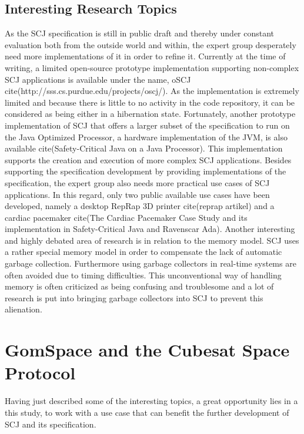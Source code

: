 

\subsection{Interesting Research Topics} %
\label{sub:interestingresearch}
As the SCJ specification is still in public draft and thereby under constant evaluation both from the outside world and within, the expert group desperately need more implementations of it in order to refine it. Currently at the time of writing, a limited open-source prototype implementation supporting non-complex SCJ applications is available under the name, oSCJ cite(http://sss.cs.purdue.edu/projects/oscj/). As the implementation is extremely limited and because there is little to no activity in the code repository, it can be considered as being either in a hibernation state. Fortunately, another prototype implementation of SCJ that offers a larger subset of the specification to run on the Java Optimized Processor, a hardware implementation of the JVM, is also available cite(Safety-Critical Java on a Java Processor). This implementation supports the creation and execution of more complex SCJ applications. Besides supporting the specification development by providing implementations of the specification, the expert group also needs more practical use cases of SCJ applications. In this regard, only two public available use cases have been developed, namely a desktop RepRap 3D printer cite(reprap artikel) and a cardiac pacemaker cite(The Cardiac Pacemaker Case Study and its implementation in Safety-Critical Java and Ravenscar Ada). Another interesting and highly debated area of research is in relation to the memory model. SCJ uses a rather special memory model in order to compensate the lack of automatic garbage collection. Furthermore using garbage collectors in real-time systems are often avoided due to timing difficulties. This unconventional way of handling memory is often criticized as being confusing and troublesome and a lot of research is put into bringing garbage collectors into SCJ to prevent this alienation.

\section{GomSpace and the Cubesat Space Protocol} %
\label{sec:gomspace_and_the_cubesat_space_protocol}
Having just described some of the interesting topics, a great opportunity lies in a this study, to work with a use case that can benefit the further development of SCJ and its specification.

